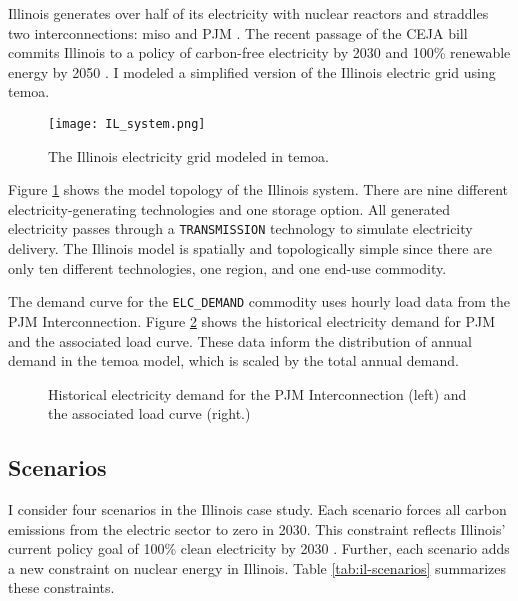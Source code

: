 Illinois generates over half of its electricity with nuclear reactors
and straddles two interconnections: \gls{miso} and PJM
\cite{energy_information_administration_eia_nodate}. The recent
passage of the CEJA bill commits Illinois to a policy of carbon-free electricity
by 2030 and 100\% renewable energy by 2050 \cite{harmon_climate_2021}.
I modeled a simplified version of the Illinois electric grid using \gls{temoa}.

\begin{figure}[H]
  \centering
  \texttt{[image: IL\_system.png]}
  \caption{The Illinois electricity grid modeled in \gls{temoa}.}
  \label{fig:ilsys}
\end{figure}

Figure \ref{fig:ilsys} shows the model topology of the Illinois system. There
are nine different electricity-generating technologies and one storage option.
All generated electricity passes through a \texttt{TRANSMISSION} technology
to simulate electricity delivery. The Illinois model is spatially and topologically
simple since there are only ten different technologies, one region, and one
end-use commodity.

The demand curve for the \texttt{ELC\_DEMAND} commodity uses hourly load
data from the PJM Interconnection. Figure \ref{fig:pjm-elc} shows the historical
electricity demand for PJM and the associated load curve. These data inform the
distribution of annual demand in the \gls{temoa} model, which is scaled by the
total annual demand.

\begin{figure}[H]
  \centering
  \resizebox{\columnwidth}{!}{}
  \caption{Historical electricity demand for the PJM Interconnection (left) and
  the associated load curve (right.)}
  \label{fig:pjm-elc}
\end{figure}

\subsection{Scenarios}
I consider four scenarios in the Illinois case study. Each scenario forces
all carbon emissions from the electric sector to zero in 2030. This constraint
reflects Illinois' current policy goal of 100\% clean electricity by 2030 \cite{office_of_governor_jb_pritzker_gov_2021}.
Further, each scenario adds a new constraint on nuclear energy in Illinois. Table
\ref{tab:il-scenarios} summarizes these constraints.

